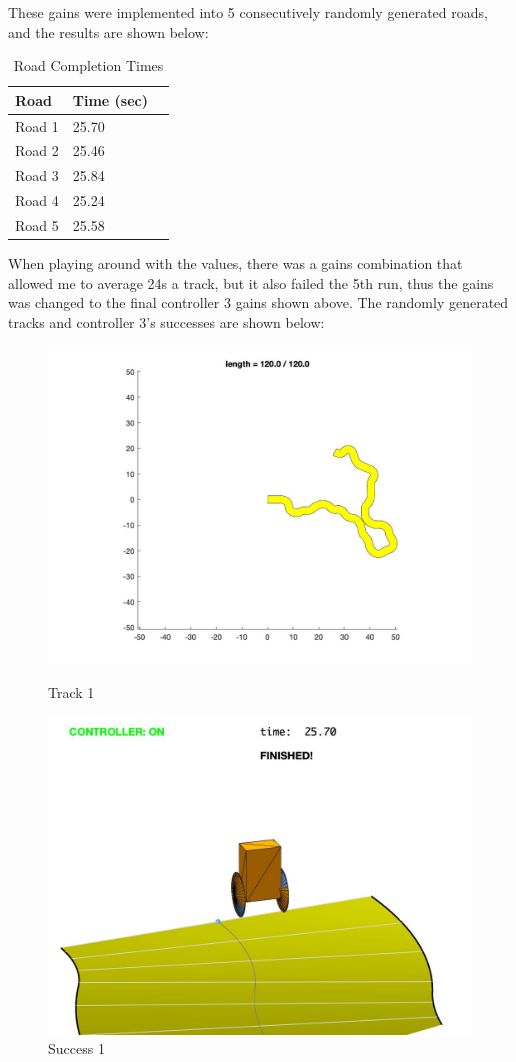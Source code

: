 \documentclass{article}
\begin{document}
 These gains were implemented into 5 consecutively randomly generated roads, and the results are shown below:
 \begin{table}[h!]
\centering
\begin{tabular}{|p{4cm}|p{4cm}|p{4cm}|}
\hline
Road & Time (sec)\\
\hline \hline
Road 1 & 25.70\\
Road 2 & 25.46\\
Road 3 & 25.84\\ 
Road 4 & 25.24\\ 
Road 5 & 25.58\\
\hline
\end{tabular}
\caption{Road Completion Times\label{roadTimesGain}}
\end{table}
When playing around with the values, there was a gains combination that allowed me to average 24s a track, but it also failed the 5th run, thus the gains was changed to the final controller 3 gains shown above. The randomly generated tracks and controller 3's successes are shown below:
\begin{figure}[H]
\centering
\begin{minipage}{.5\textwidth}
	\centering
	\includegraphics[width=.8\linewidth]{track 1.jpg}
	\caption{Track 1}
	\end{minipage}%
\begin{minipage}{.5\textwidth}
	\centering
	\includegraphics[width=.8\linewidth]{track 1r.jpg}
	\caption{Success 1}
\end{minipage}
\end{figure}
\end{document}
